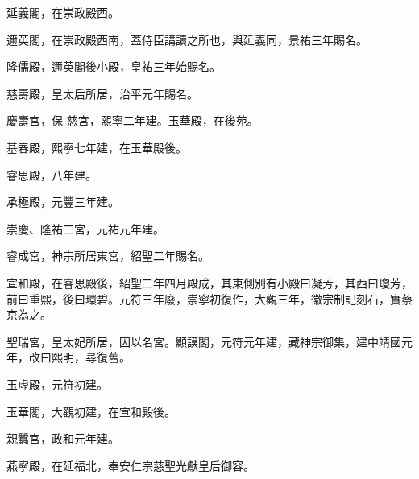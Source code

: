\begin{pinyinscope}
 延義閣，在崇政殿西。



 邇英閣，在崇政殿西南，蓋侍臣講讀之所也，與延義同，景祐三年賜名。



 隆儒殿，邇英閣後小殿，皇祐三年始賜名。



 慈壽殿，皇太后所居，治平元年賜名。



 慶壽宮，保
 慈宮，熙寧二年建。玉華殿，在後苑。



 基春殿，熙寧七年建，在玉華殿後。



 睿思殿，八年建。



 承極殿，元豐三年建。



 崇慶、隆祐二宮，元祐元年建。



 睿成宮，神宗所居東宮，紹聖二年賜名。



 宣和殿，在睿思殿後，紹聖二年四月殿成，其東側別有小殿曰凝芳，其西曰瓊芳，前曰重熙，後曰環碧。元符三年廢，崇寧初復作，大觀三年，徽宗制記刻石，實蔡京為之。



 聖瑞宮，皇太妃所居，因以名宮。顯謨閣，元符元年建，藏神宗御集，建中靖國元年，改曰熙明，尋復舊。



 玉虛殿，元符初建。



 玉華閣，大觀初建，在宣和殿後。



 親蠶宮，政和元年建。



 燕寧殿，在延福北，奉安仁宗慈聖光獻皇后御容。




\end{pinyinscope}
